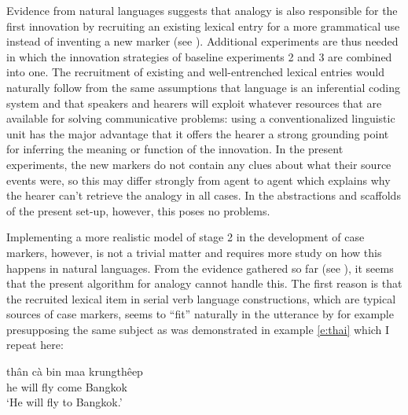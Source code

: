  Evidence from natural languages suggests that analogy is also responsible for the first innovation by recruiting an existing lexical entry for a more grammatical use instead of inventing a new marker (see ). Additional experiments are thus needed in which the innovation strategies of baseline experiments 2 and 3 are combined into one. The recruitment of existing and well-entrenched lexical entries would naturally follow from the same assumptions that language is an inferential coding system and that speakers and hearers will exploit whatever resources that are available for solving communicative problems: using a conventionalized linguistic unit has the major advantage that it offers the hearer a strong grounding point for inferring the meaning or function of the innovation. In the present experiments, the new markers do not contain any clues about what their source events were, so this may differ strongly from agent to agent which explains why the hearer can't retrieve the analogy in all cases. In the abstractions and scaffolds of the present set-up, however, this poses no problems.

Implementing a more realistic model of stage 2 in the development of case markers, however, is not a trivial matter and requires more study on how this happens in natural languages. From the evidence gathered so far (see ), it seems that the present algorithm for analogy cannot handle this. The first reason is that the recruited lexical item in serial verb language constructions, which are typical sources of case markers, seems to ``fit'' naturally in the utterance by for example presupposing the same subject as was demonstrated in example \ref{e:thai} which I repeat here: 

\ea
\gll th\^{a}n c\`{a} bin maa krungth\^{e}ep \\
he will fly come Bangkok \\
\glt `He will fly to Bangkok.' \\
\citep[163]{blake94case}
\z


